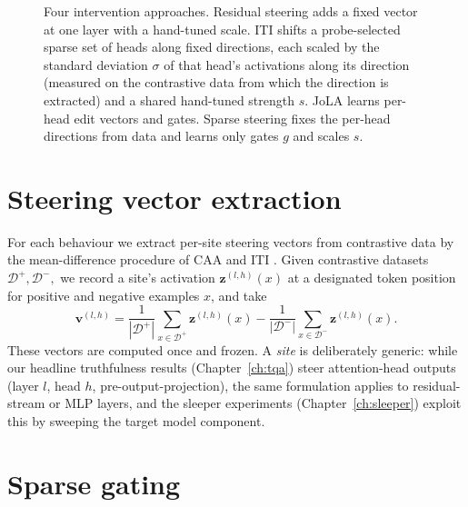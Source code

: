 \documentclass[logo,msc,notimes]{infthesis}
\begin{document}
\begin{figure}[htbp]
\centering
\resizebox{!}{0.8\textheight}{}
\caption{Four intervention approaches. Residual steering adds a fixed vector at one layer with a
hand-tuned scale. ITI shifts a probe-selected sparse set of heads along fixed directions, each
scaled by the standard deviation $\sigma$ of that head's activations along its direction (measured on
the contrastive data from which the direction is extracted) and a shared hand-tuned strength $s$. JoLA learns per-head edit vectors and gates. Sparse steering
fixes the per-head directions from data and learns only gates $g$ and scales $s$.}
\label{fig:method}
\end{figure}

\section{Steering vector extraction}

For each behaviour we extract per-site steering vectors from contrastive data by the mean-difference
procedure of CAA \citep{rimsky2024caa} and ITI \citep{li2023iti}. Given contrastive datasets $\mathcal{D}^+,\mathcal{D}^-,$ we record
a site's activation $\mathbf{z}^{(l,h)}(x)$ at a designated token position for positive and negative
examples $x$, and take
\begin{equation}\label{eq:meandiff}
    \mathbf{v}^{(l,h)} = \frac{1}{|\mathcal{D}^+|}\sum_{x \in \mathcal{D}^+} \mathbf{z}^{(l,h)}(x)
    - \frac{1}{|\mathcal{D}^-|}\sum_{x \in \mathcal{D}^-} \mathbf{z}^{(l,h)}(x).
\end{equation}
These vectors are computed once and frozen. A \emph{site} is deliberately generic: while our headline
truthfulness results (Chapter~\ref{ch:tqa}) steer attention-head outputs (layer $l$, head $h$, pre-output-projection), the same formulation
applies to residual-stream or MLP layers, and the sleeper experiments
(Chapter~\ref{ch:sleeper}) exploit this by sweeping the target model component.

\section{Sparse gating}\label{sec:gating}
\end{document}
